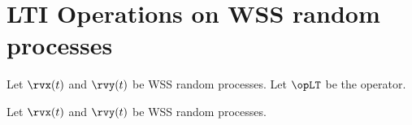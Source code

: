 \section{LTI Operations on WSS random processes}
\begin{definition}
\label{def:LSxx}
\label{def:LSyy}
\label{def:LSxy}
\label{def:LSyx}
Let $\rvx(t)$ and $\rvy(t)$ be WSS random processes.
Let $\opLT$ be the  operator.
\end{definition}

\begin{definition}
\label{def:Swxx}
\label{def:Swyy}
\label{def:Swxy}
\label{def:Swyx}
Let $\rvx(t)$ and $\rvy(t)$ be WSS random processes.
\end{definition}

